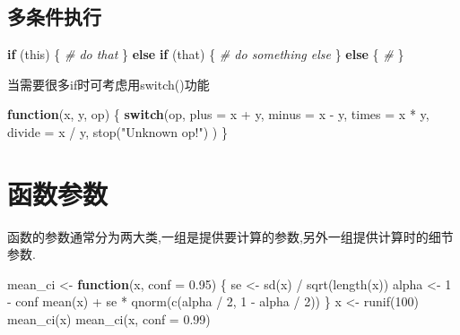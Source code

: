 \documentclass[
]{book}
\newenvironment{Shaded}{\begin{snugshade}}{\end{snugshade}}
\newcommand{\AttributeTok}[1]{\textcolor[rgb]{0.77,0.63,0.00}{#1}}
\newcommand{\CommentTok}[1]{\textcolor[rgb]{0.56,0.35,0.01}{\textit{#1}}}
\newcommand{\ControlFlowTok}[1]{\textcolor[rgb]{0.13,0.29,0.53}{\textbf{#1}}}
\newcommand{\DecValTok}[1]{\textcolor[rgb]{0.00,0.00,0.81}{#1}}
\newcommand{\FloatTok}[1]{\textcolor[rgb]{0.00,0.00,0.81}{#1}}
\newcommand{\FunctionTok}[1]{\textcolor[rgb]{0.00,0.00,0.00}{#1}}
\newcommand{\NormalTok}[1]{#1}
\newcommand{\OtherTok}[1]{\textcolor[rgb]{0.56,0.35,0.01}{#1}}
\newcommand{\SpecialCharTok}[1]{\textcolor[rgb]{0.00,0.00,0.00}{#1}}
\newcommand{\StringTok}[1]{\textcolor[rgb]{0.31,0.60,0.02}{#1}}
\begin{document}
\hypertarget{ux591aux6761ux4ef6ux6267ux884c}{%
\subsection{多条件执行}\label{ux591aux6761ux4ef6ux6267ux884c}}

\begin{Shaded}
\begin{Highlighting}[]
\ControlFlowTok{if}\NormalTok{ (this) \{}
  \CommentTok{\# do that}
\NormalTok{\} }\ControlFlowTok{else} \ControlFlowTok{if}\NormalTok{ (that) \{}
  \CommentTok{\# do something else}
\NormalTok{\} }\ControlFlowTok{else}\NormalTok{ \{}
  \CommentTok{\# }
\NormalTok{\}}
\end{Highlighting}
\end{Shaded}

当需要很多if时可考虑用switch()功能

\begin{Shaded}
\begin{Highlighting}[]
\ControlFlowTok{function}\NormalTok{(x, y, op) \{}
   \ControlFlowTok{switch}\NormalTok{(op,}
     \AttributeTok{plus =}\NormalTok{ x }\SpecialCharTok{+}\NormalTok{ y,}
     \AttributeTok{minus =}\NormalTok{ x }\SpecialCharTok{{-}}\NormalTok{ y,}
     \AttributeTok{times =}\NormalTok{ x }\SpecialCharTok{*}\NormalTok{ y,}
     \AttributeTok{divide =}\NormalTok{ x }\SpecialCharTok{/}\NormalTok{ y,}
     \FunctionTok{stop}\NormalTok{(}\StringTok{"Unknown op!"}\NormalTok{)}
\NormalTok{   )}
\NormalTok{ \}}
\end{Highlighting}
\end{Shaded}

\hypertarget{ux51fdux6570ux53c2ux6570-1}{%
\section{函数参数}\label{ux51fdux6570ux53c2ux6570-1}}

函数的参数通常分为两大类,一组是提供要计算的参数,另外一组提供计算时的细节参数.

\begin{Shaded}
\begin{Highlighting}[]
\NormalTok{mean\_ci }\OtherTok{\textless{}{-}} \ControlFlowTok{function}\NormalTok{(x, }\AttributeTok{conf =} \FloatTok{0.95}\NormalTok{) \{}
\NormalTok{  se }\OtherTok{\textless{}{-}} \FunctionTok{sd}\NormalTok{(x) }\SpecialCharTok{/} \FunctionTok{sqrt}\NormalTok{(}\FunctionTok{length}\NormalTok{(x))}
\NormalTok{  alpha }\OtherTok{\textless{}{-}} \DecValTok{1} \SpecialCharTok{{-}}\NormalTok{ conf}
  \FunctionTok{mean}\NormalTok{(x) }\SpecialCharTok{+}\NormalTok{ se }\SpecialCharTok{*} \FunctionTok{qnorm}\NormalTok{(}\FunctionTok{c}\NormalTok{(alpha }\SpecialCharTok{/} \DecValTok{2}\NormalTok{, }\DecValTok{1} \SpecialCharTok{{-}}\NormalTok{ alpha }\SpecialCharTok{/} \DecValTok{2}\NormalTok{))}
\NormalTok{\}}
\NormalTok{x }\OtherTok{\textless{}{-}} \FunctionTok{runif}\NormalTok{(}\DecValTok{100}\NormalTok{)}
\FunctionTok{mean\_ci}\NormalTok{(x)}
\FunctionTok{mean\_ci}\NormalTok{(x, }\AttributeTok{conf =} \FloatTok{0.99}\NormalTok{)}
\end{Highlighting}
\end{Shaded}
\end{document}
